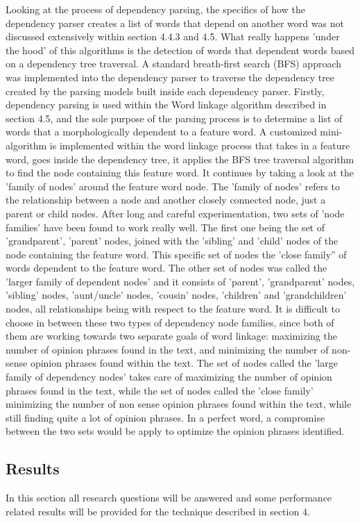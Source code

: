 \documentclass{sig-alternate}
\begin{document}
Looking at the process of dependency parsing, the specifics of how the dependency parser creates a list of words that depend on another word was not discussed extensively within section 4.4.3 and 4.5. What really happens 'under the hood' of this algorithms is the detection of words that dependent words based on a dependency tree traversal. A standard breath-first search (BFS) approach was implemented into the dependency parser to traverse the dependency tree created by the parsing models built inside each dependency parser. Firstly, dependency parsing is used within the Word linkage algorithm described in section 4.5, and the sole purpose of the parsing process is to determine a list of words that a morphologically dependent to a feature word. A customized mini-algorithm is implemented within the word linkage process that takes in a feature word, goes inside the dependency tree, it applies the BFS tree traversal algorithm to find the node containing this feature word. It continues by taking a look at the 'family of nodes' around the feature word node. The 'family of nodes' refers to the relationship between a node and another closely connected node, just a parent or child nodes. After long and careful experimentation, two sets of 'node families' have been found to work really well. The first one being the set of 'grandparent', 'parent' nodes, joined with the 'sibling' and 'child' nodes of the node containing the feature word. This specific set of nodes the 'close family'' of words dependent to the feature word. The other set of nodes was called the 'larger family of dependent nodes' and it consists of 'parent', 'grandparent' nodes, 'sibling' nodes, 'aunt/uncle' nodes, 'cousin' nodes, 'children' and 'grandchildren' nodes, all relationships being with respect to the feature word. It is difficult to choose in between these two types of dependency node families, since both of them are working towards two separate goals of word linkage: maximizing the number of opinion phrases found in the text, and minimizing the number of non-sense opinion phrases found within the text. The set of nodes called the 'large family of dependency nodes' takes care of maximizing the number of opinion phrases found in the text, while the set of nodes called the 'close family' minimizing the number of non sense opinion phrases found within the text, while still finding quite a lot of opinion phrases. In a perfect word, a compromise between the two sets would be apply to optimize the opinion phrases identified. 

\subsection{Results}
In this section all research questions will be answered and some performance related results will be provided for the technique described in section 4. 
\end{document}
